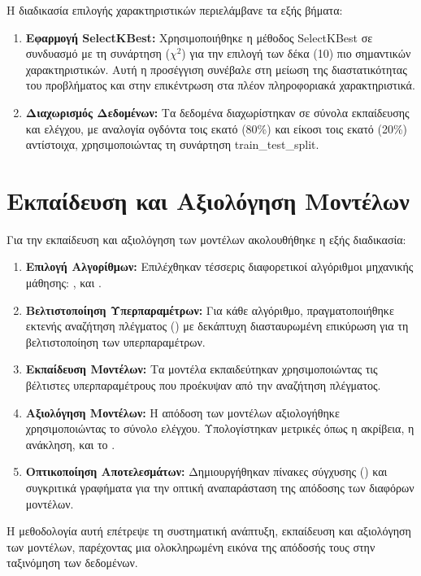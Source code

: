 Η διαδικασία επιλογής χαρακτηριστικών περιελάμβανε τα εξής βήματα:
\begin{enumerate}
\item
  \textbf{Εφαρμογή \textlatin{SelectKBest}:} Χρησιμοποιήθηκε η μέθοδος
  \textlatin{SelectKBest} σε συνδυασμό με τη συνάρτηση (${\chi}^2$) για
  την επιλογή των δέκα (10) πιο σημαντικών χαρακτηριστικών. Αυτή η
  προσέγγιση συνέβαλε στη μείωση της διαστατικότητας του προβλήματος και
  στην επικέντρωση στα πλέον πληροφοριακά χαρακτηριστικά.

\item
  \textbf{Διαχωρισμός Δεδομένων:} Τα δεδομένα διαχωρίστηκαν σε σύνολα
  εκπαίδευσης και ελέγχου, με αναλογία ογδόντα τοις εκατό (80\%) και
  είκοσι τοις εκατό (20\%) αντίστοιχα, χρησιμοποιώντας τη συνάρτηση
  \textlatin{train\_test\_split}.
\end{enumerate}

\section{Εκπαίδευση και Αξιολόγηση Μοντέλων}

Για την εκπαίδευση και αξιολόγηση των μοντέλων ακολουθήθηκε η εξής
διαδικασία:
\begin{enumerate}
\item
  \textbf{Επιλογή Αλγορίθμων:} Επιλέχθηκαν τέσσερις διαφορετικοί
  αλγόριθμοι μηχανικής μάθησης: , και .
\item
  \textbf{Βελτιστοποίηση Υπερπαραμέτρων:} Για κάθε αλγόριθμο,
  πραγματοποιήθηκε εκτενής αναζήτηση πλέγματος () με
  δεκάπτυχη διασταυρωμένη επικύρωση για τη βελτιστοποίηση των
  υπερπαραμέτρων.

\item
  \textbf{Εκπαίδευση Μοντέλων:} Τα μοντέλα εκπαιδεύτηκαν χρησιμοποιώντας
  τις βέλτιστες υπερπαραμέτρους που προέκυψαν από την αναζήτηση
  πλέγματος.

\item
  \textbf{Αξιολόγηση Μοντέλων:} Η απόδοση των μοντέλων αξιολογήθηκε
  χρησιμοποιώντας το σύνολο ελέγχου. Υπολογίστηκαν μετρικές όπως η
  ακρίβεια, η ανάκληση, και το .

\item
  \textbf{Οπτικοποίηση Αποτελεσμάτων:} Δημιουργήθηκαν πίνακες σύγχυσης
  () και συγκριτικά γραφήματα για την οπτική
  αναπαράσταση της απόδοσης των διαφόρων μοντέλων.
\end{enumerate}
Η μεθοδολογία αυτή επέτρεψε τη συστηματική ανάπτυξη, εκπαίδευση και
αξιολόγηση των μοντέλων, παρέχοντας μια ολοκληρωμένη εικόνα της απόδοσής
τους στην ταξινόμηση των δεδομένων.

